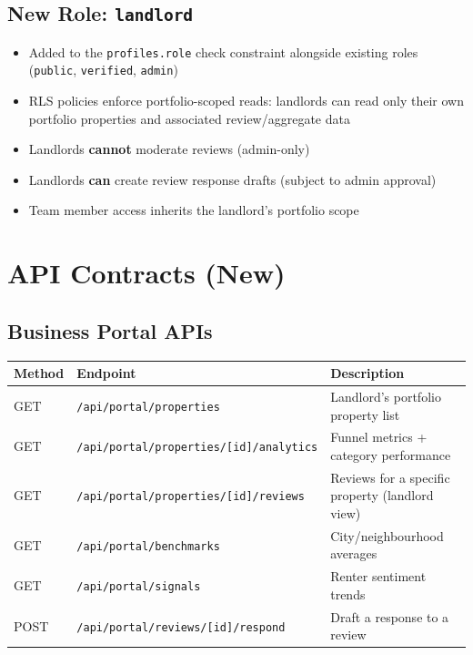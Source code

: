 \documentclass[11pt,letterpaper]{article}
\begin{document}
\subsection{New Role: \texttt{landlord}}

\begin{itemize}
    \item Added to the \texttt{profiles.role} check constraint alongside existing roles (\texttt{public}, \texttt{verified}, \texttt{admin})
    \item RLS policies enforce portfolio-scoped reads: landlords can read only their own portfolio properties and associated review/aggregate data
    \item Landlords \textbf{cannot} moderate reviews (admin-only)
    \item Landlords \textbf{can} create review response drafts (subject to admin approval)
    \item Team member access inherits the landlord's portfolio scope
\end{itemize}

\section{API Contracts (New)}

\subsection{Business Portal APIs}

\begin{longtable}{l l p{6cm}}
\toprule
\textbf{Method} & \textbf{Endpoint} & \textbf{Description} \\
\midrule
\endhead
GET  & \texttt{/api/portal/properties}               & Landlord's portfolio property list \\
GET  & \texttt{/api/portal/properties/[id]/analytics} & Funnel metrics + category performance \\
GET  & \texttt{/api/portal/properties/[id]/reviews}   & Reviews for a specific property (landlord view) \\
GET  & \texttt{/api/portal/benchmarks}                & City/neighbourhood averages \\
GET  & \texttt{/api/portal/signals}                   & Renter sentiment trends \\
POST & \texttt{/api/portal/reviews/[id]/respond}       & Draft a response to a review \\
\bottomrule
\end{longtable}
\end{document}
